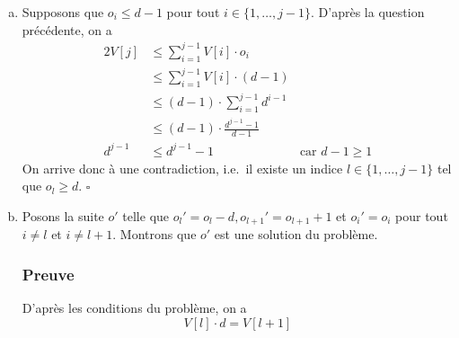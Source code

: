\documentclass[12pt,a4paper]{article}
\begin{document}
\begin{enumerate}[a)]
 En utilisant le r\'esultat de la question pr\'ec\'edente, il en r\'esulte que
 \begin{equation*}
    V[j]\cdot g_j \leq \displaystyle\sum_{i=1}^{j} V[i]\cdot o_i
 \end{equation*}
 
 D'o\`u, 
 \begin{equation*}
    V[j]\cdot (g_j - o_j) \leq \displaystyle\sum_{i=1}^{j-1} V[i]\cdot o_i 
 \end{equation*}
 Or $g_j - o_j \geq 1$ d'apr\`es la question a) et le fait que ce sont des entiers naturels.
 Donc, \( V[j] \leq \displaystyle\sum_{i=1}^{j-1} V[i]\cdot o_i\) \hfill\ensuremath{\square}
 
 Cette propri\'et\'e pr\'ecise l'une des mani\`eres d'utiliser le moins possible de bocaux pour remplir une quantit\'e de confiture donn\'ee. En effet, elle consiste \`a remplir au complet tous les bocaux des plus grandes capacit\'es possibles jusqu'\`a l'arriv\'ee \`a une certaine capacit\'e. Pour cette derni\`ere, on pr\'ef\`ere ne pas remplir tous les bocaux possibles, mais de se servir plut\^ot de ceux de capacit\'e plus petite. 
 
 \item Supposons que $o_i \leq d-1$ pour tout $i \in \{1,\dotsc,j-1\}$. D'apr\`es la question pr\'ec\'edente, on a 
 \begin{alignat*}{2}
 	V[j] &\leq \displaystyle\sum_{i=1}^{j-1} V[i]\cdot o_i \\
 		 &\leq \displaystyle\sum_{i=1}^{j-1} V[i]\cdot (d-1) \\
 		 &\leq (d-1)\cdot \displaystyle\sum_{i=1}^{j-1} d^{i-1} \\
 		 &\leq (d-1)\cdot \frac{d^{j-1}-1}{d-1} \\
 	d^{j-1}	 &\leq d^{j-1}-1 & \text{car } d-1 \geq 1
 \end{alignat*}
 On arrive donc \`a une contradiction, i.e.\ il existe un indice \(l \in \{1,\dotsc,j-1\}\) tel que $o_l \geq d$. \hfill\ensuremath{\square}
 
 \item Posons la suite $o'$ telle que $o_{l}' = o_l-d, o_{l+1}' = o_{l+1}+1$ et $o_i' = o_i$ pour tout $i \neq l$ et $i \neq l+1$. Montrons que $o'$ est une solution du probl\`eme.
 
 \subsubsection*{Preuve}
 D'apr\`es les conditions du probl\`eme, on a
 \begin{equation*}
    V[l]\cdot d = V[l+1]
 \end{equation*}
 

\end{enumerate}
\end{document}

